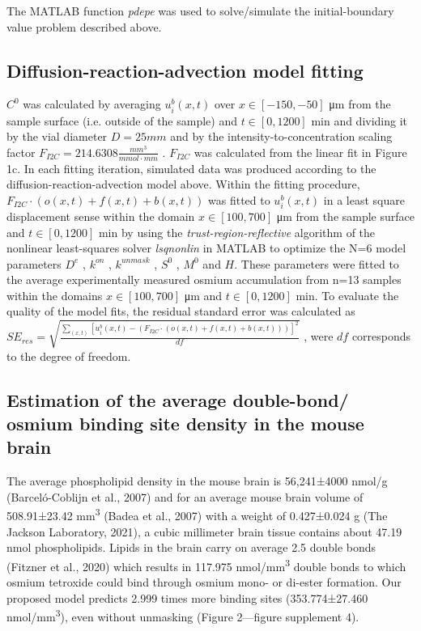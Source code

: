 \documentclass{article}
\begin{document}
The MATLAB function \emph{pdepe} was used to solve/simulate the initial-boundary value problem described above.

\subsection*{Diffusion-reaction-advection model fitting}
$C^{0}$ was calculated by averaging $u_{i}^{b}\left(x,t\right)$ over $x\in\left[-150,-50\right]$ μm from the sample surface (i.e. outside of the sample) and $t\in\left[0,1200\right]$ min and dividing it by the vial diameter $D = 25mm$ and by the intensity-to-concentration scaling factor $F_{I2C} = 214.6308\frac{mm^{3}}{mmol\cdot mm}$ . $F_{I2C}$ was calculated from the linear fit in Figure 1c. In each fitting iteration, simulated data was produced according to the diffusion-reaction-advection model above. Within the fitting procedure, $F_{I2C}\cdot\left(o\left(x,t\right)+f\left(x,t\right)+b\left(x,t\right)\right)$ was fitted to $u_{i}^{b}\left(x,t\right)$ in a least square displacement sense within the domain $x\in\left[100,700\right]$ μm from the sample surface and $t\in\left[0,1200\right]$ min by using the \emph{trust-region-reflective} algorithm of the nonlinear least-squares solver \emph{lsqnonlin} in MATLAB to optimize the N=6 model parameters $D^{e}$ , $k^{on}$ , $k^{unmask}$ , $S^{0}$ , $M^{0}$ and $H$. These parameters were fitted to the average experimentally measured osmium accumulation from n=13 samples within the domains $x\in\left[100,700\right]$ μm and $t\in\left[0,1200\right]$ min. To evaluate the quality of the model fits, the residual standard error was calculated as $SE_{res} = \sqrt{\frac{\sum_{(x,t)}\left[u_{i}^{b}(x,t)-\left(F_{I2C}\cdot\left(o(x,t)+f(x,t)+b(x,t)\right)\right)\right]^{2}}{df}}$ , were $df$ corresponds to the degree of freedom.

\subsection*{Estimation of the average double-bond/ osmium binding site density in the mouse brain}
The average phospholipid density in the mouse brain is 56,241±4000 nmol/g (Barceló-Coblijn et al., 2007) and for an average mouse brain volume of 508.91±23.42 mm\textsuperscript{3} (Badea et al., 2007) with a weight of 0.427±0.024 g (The Jackson Laboratory, 2021), a cubic millimeter brain tissue contains about 47.19 nmol phospholipids. Lipids in the brain carry on average 2.5 double bonds (Fitzner et al., 2020) which results in 117.975 nmol/mm\textsuperscript{3} double bonds to which osmium tetroxide could bind through osmium mono- or di-ester formation. Our proposed model predicts 2.999 times more binding sites (353.774±27.460 nmol/mm\textsuperscript{3}), even without unmasking (Figure 2—figure supplement 4).
\end{document}
